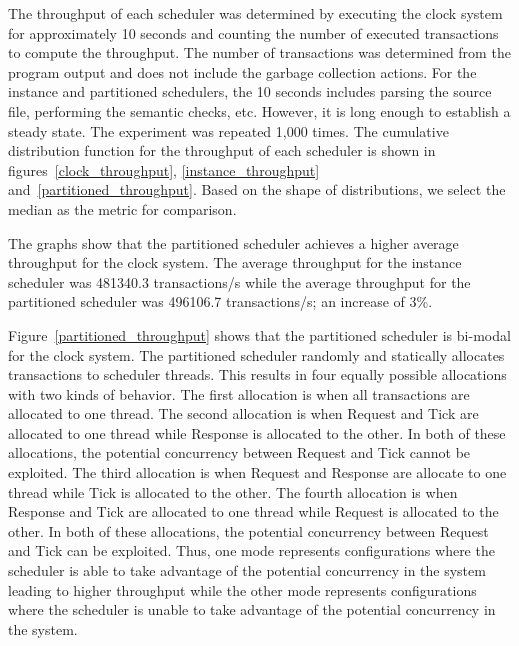 The throughput of each scheduler was determined by executing the clock system for approximately 10 seconds and counting the number of executed transactions to compute the throughput.
The number of transactions was determined from the program output and does not include the garbage collection actions.
For the instance and partitioned schedulers, the 10 seconds includes parsing the source file, performing the semantic checks, etc.
However, it is long enough to establish a steady state.
The experiment was repeated 1,000 times.
The cumulative distribution function for the throughput of each scheduler is shown in figures~\ref{clock_throughput}, \ref{instance_throughput} and~\ref{partitioned_throughput}.
Based on the shape of distributions, we select the median as the metric for comparison.

The graphs show that the partitioned scheduler achieves a higher average throughput for the clock system.
The average throughput for the instance scheduler was 481340.3 transactions/s while the average throughput for the partitioned scheduler was 496106.7 transactions/s; an increase of 3\%.

Figure~\ref{partitioned_throughput} shows that the partitioned scheduler is bi-modal for the clock system.
The partitioned scheduler randomly and statically allocates transactions to scheduler threads.
This results in four equally possible allocations with two kinds of behavior.
The first allocation is when all transactions are allocated to one thread.
The second allocation is when Request and Tick are allocated to one thread while Response is allocated to the other.
In both of these allocations, the potential concurrency between Request and Tick cannot be exploited.
The third allocation is when Request and Response are allocate to one thread while Tick is allocated to the other.
The fourth allocation is when Response and Tick are allocated to one thread while Request is allocated to the other.
In both of these allocations, the potential concurrency between Request and Tick can be exploited.
Thus, one mode represents configurations where the scheduler is able to take advantage of the potential concurrency in the system leading to higher throughput while the other mode represents configurations where the scheduler is unable to take advantage of the potential concurrency in the system.

